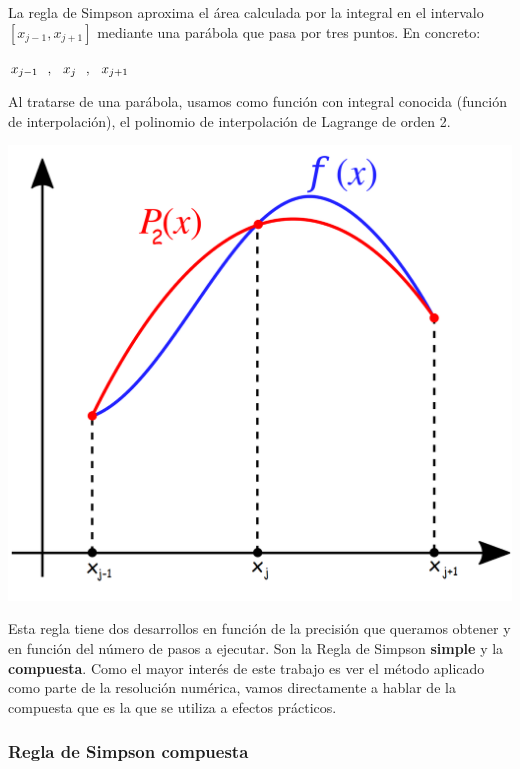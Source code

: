 \documentclass[12pt]{article}
\begin{document}
La regla de Simpson aproxima el área calculada por la integral en el intervalo $[x_{j-1} , x_{j+1}]$ mediante una parábola que pasa por tres puntos. En concreto:

\begin{center}
$x_{j-1} \hspace{2.5mm},\hspace{2.5mm} x_{j} \hspace{2.5mm},\hspace{2.5mm} x_{j+1}$
\end{center}

Al tratarse de una parábola, usamos como función con integral conocida (función de interpolación), el polinomio de interpolación de Lagrange de orden 2.\\

\begin{center}
\includegraphics[scale=0.26]{intro}
\end{center}

Esta regla tiene dos desarrollos en función de la precisión que queramos obtener y en función del número de pasos a ejecutar. Son la Regla de Simpson \textbf{simple} y la \textbf{compuesta}. Como el mayor interés de este trabajo es ver el método aplicado como parte de la resolución numérica, vamos directamente a hablar de la compuesta que es la que se utiliza a efectos prácticos.

\subsubsection{Regla de Simpson compuesta}
\end{document}
